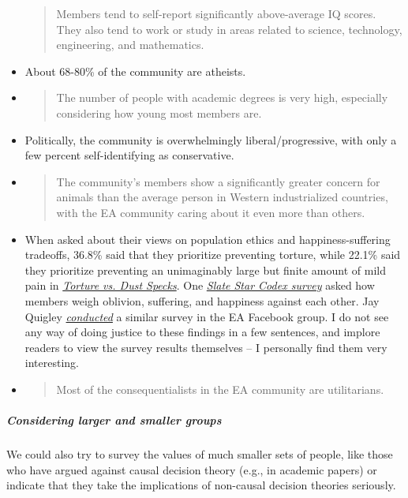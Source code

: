 \begin{itemize}
\begin{quote}
  Members tend to self-report significantly above-average IQ scores.
  They also tend to work or study in areas related to science,
  technology, engineering, and mathematics.
  \end{quote}
\item
  About 68-80\% of the community are atheists.
\item
  \begin{quote}
  The number of people with academic degrees is very high, especially
  considering how young most members are.
  \end{quote}
\item
  Politically, the community is overwhelmingly liberal/progressive, with
  only a few percent self-identifying as conservative.
\item
  \begin{quote}
  The community's members show a significantly greater concern for
  animals than the average person in Western industrialized countries,
  with the EA community caring about it even more than others.
  \end{quote}
\item
  When asked about their views on population ethics and
  happiness-suffering tradeoffs, 36.8\% said that they prioritize
  preventing torture, while 22.1\% said they prioritize preventing an
  unimaginably large but finite amount of mild pain in
  \href{http://lesswrong.com/lw/kn/torture_vs_dust_specks/}{\emph{Torture
  vs. Dust Specks}}. One
  \href{http://slatestarcodex.com/2016/06/28/survey-results-suffering-vs-oblivion/}{\emph{Slate
  Star Codex survey}} asked how members weigh oblivion, suffering, and
  happiness against each other. Jay Quigley
  \href{https://www.facebook.com/groups/effective.altruists/permalink/1117549958301360/}{\emph{conducted}}
  a similar survey in the EA Facebook group. I do not see any way of
  doing justice to these findings in a few sentences, and implore
  readers to view the survey results themselves -- I personally find
  them very interesting.
\item
  \begin{quote}
  Most of the consequentialists in the EA community are utilitarians.
  \end{quote}
\end{itemize}

\subparagraph{Considering larger and smaller
groups}\label{considering-larger-and-smaller-groups}

We could also try to survey the values of much smaller sets of people,
like those who have argued against causal decision theory (e.g., in
academic papers) or indicate that they take the implications of
non-causal decision theories seriously.


